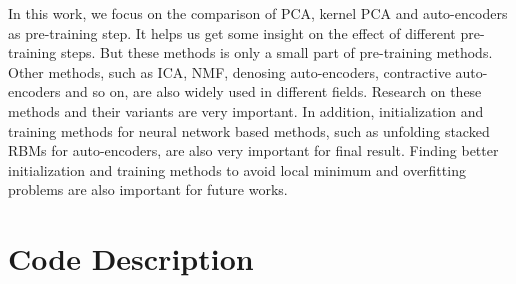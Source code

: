 \documentclass[tikz, multi,dvipsnames,svgnames,x11names]{article}
\begin{document}
In this work, we focus on the comparison of PCA, kernel PCA and auto-encoders as pre-training step. It helps us get some insight on the effect of different pre-training steps. But these methods is only a small part of pre-training methods. Other methods, such as ICA, NMF, denosing auto-encoders, contractive auto-encoders and so on, are also widely used in different fields. Research on these methods and their variants are very important. In addition, initialization and training methods for neural network based methods, such as unfolding stacked RBMs for auto-encoders, are also very important for final result. Finding better initialization and training methods to avoid local minimum and overfitting problems are also important for future works.

\vfill\pagebreak



\vfill\pagebreak
\hfill
\newpage
\section{Code Description}
\label{sec:code}

\end{document}
